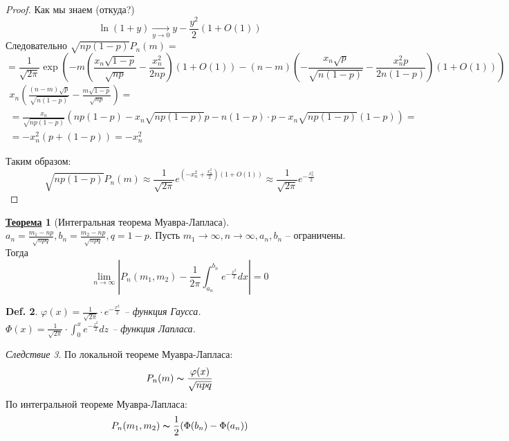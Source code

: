 \documentclass[12pt]{article}
\def\PHI{\varphi}        %
\theoremstyle{definition} %
\newtheorem{Thm}{\underline{Теорема}}[subsection] %
\theoremstyle{plain} %
\newtheorem{Def}[Thm]{Def.} %
\theoremstyle{remark} %
\newtheorem{Cons}[Thm]{Следствие} %
\begin{document}
\begin{proof}
    Как мы знаем (откуда?)
    \[\ln(1 + y) \xrightarrow[y \to 0]{}y - \frac{y^2}{2}(1 + O(1))\]
    Следовательно $\sqrt{np(1 - p)}P_n(m) =$ 
    \[
        = \frac{1}{\sqrt{2\pi}} \exp \left(-m \left( \frac{x_n \sqrt{1 - p}}{\sqrt{np}} - \frac{x_n^2}{2np}\right)(1 + O(1)) - (n - m)\left(- \frac{x_n\sqrt{p}}{\sqrt{n(1 - p)}} - \frac{x_n^2p}{2n(1 - p)}\right)(1 + O(1))\right)
    \]
    \begin{gather*}
        x_n \left( \frac{(n - m)\sqrt{p}}{\sqrt{n(1 - p)}} - \frac{m\sqrt{1 - p}}{\sqrt{np}}\right) = \\
        = \frac{x_n}{\sqrt{np(1 - p)}}\left(np(1 - p) - x_n\sqrt{np(1 - p)} p - n(1 - p)\cdot p - x_n\sqrt{np(1 - p)}(1 - p)\right) = \\
        = -x_n^2 (p + (1 - p)) = -x_n^2
    \end{gather*}

    Таким образом:
    \[\sqrt{np(1 - p)}P_n(m) \approx \frac{1}{\sqrt{2\pi}}e^{\left(-x_n^2 + \frac{x_n^2}{2}\right)(1 + O(1))} \approx \frac{1}{\sqrt{2\pi}}e^{- \frac{x_n^2}{2}}\]

\end{proof}

\begin{Thm}[Интегральная теорема Муавра-Лапласа]
  $a_n = \frac{m_1 - np}{\sqrt{npq}}, b_n = \frac{m_2 - np}{\sqrt{npq}}, q = 1 - p$. Пусть $m_1 \to \infty, n \to \infty, a_n, b_n$ -- ограничены. Тогда
  \[\lim_{n \to \infty} \left|P_n(m_1, m_2) - \frac{1}{2\pi} \int_{a_n}^{b_n} e^{- \frac{x^2}{2}} dx\right| = 0\]  
\end{Thm}

\begin{Def}
  $\PHI (x) = \frac{1}{\sqrt{2\pi}} \cdot e^{- \frac{x^2}{2}}$ -- функция Гаусса. \\
  $\Phi(x) = \frac{1}{\sqrt{2\pi}} \cdot \int_{0}^{x} e^{- \frac{z^2}{2}}dz$ -- функция Лапласа. 
\end{Def}

\begin{Cons}
  По локальной теореме Муавра-Лапласа:
  \[P_n(m) \thicksim \frac{\PHI(x)}{\sqrt{npq}}\]
  По интегральной теореме Муавра-Лапласа:
  \[P_n(m_1, m_2) \thicksim \frac{1}{2}(\Phi(b_n) - \Phi(a_n))\]
\end{Cons}
\end{document}
